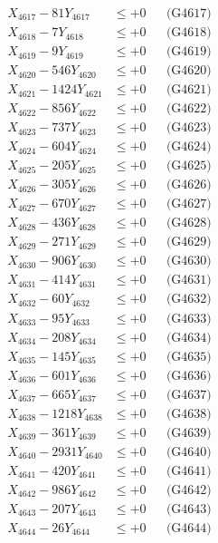 \documentclass[a4paper,10pt]{article}
\begin{document}
{\begin{align}
X_{4617} - 81Y_{4617} &\leq +0 && \text{(G4617)} \\
X_{4618} - 7Y_{4618} &\leq +0 && \text{(G4618)} \\
X_{4619} - 9Y_{4619} &\leq +0 && \text{(G4619)} \\
X_{4620} - 546Y_{4620} &\leq +0 && \text{(G4620)} \\
\allowbreak
X_{4621} - 1424Y_{4621} &\leq +0 && \text{(G4621)} \\
X_{4622} - 856Y_{4622} &\leq +0 && \text{(G4622)} \\
X_{4623} - 737Y_{4623} &\leq +0 && \text{(G4623)} \\
X_{4624} - 604Y_{4624} &\leq +0 && \text{(G4624)} \\
X_{4625} - 205Y_{4625} &\leq +0 && \text{(G4625)} \\
X_{4626} - 305Y_{4626} &\leq +0 && \text{(G4626)} \\
X_{4627} - 670Y_{4627} &\leq +0 && \text{(G4627)} \\
X_{4628} - 436Y_{4628} &\leq +0 && \text{(G4628)} \\
X_{4629} - 271Y_{4629} &\leq +0 && \text{(G4629)} \\
X_{4630} - 906Y_{4630} &\leq +0 && \text{(G4630)} \\
\allowbreak
X_{4631} - 414Y_{4631} &\leq +0 && \text{(G4631)} \\
X_{4632} - 60Y_{4632} &\leq +0 && \text{(G4632)} \\
X_{4633} - 95Y_{4633} &\leq +0 && \text{(G4633)} \\
X_{4634} - 208Y_{4634} &\leq +0 && \text{(G4634)} \\
X_{4635} - 145Y_{4635} &\leq +0 && \text{(G4635)} \\
X_{4636} - 601Y_{4636} &\leq +0 && \text{(G4636)} \\
X_{4637} - 665Y_{4637} &\leq +0 && \text{(G4637)} \\
X_{4638} - 1218Y_{4638} &\leq +0 && \text{(G4638)} \\
X_{4639} - 361Y_{4639} &\leq +0 && \text{(G4639)} \\
X_{4640} - 2931Y_{4640} &\leq +0 && \text{(G4640)} \\
\allowbreak
X_{4641} - 420Y_{4641} &\leq +0 && \text{(G4641)} \\
X_{4642} - 986Y_{4642} &\leq +0 && \text{(G4642)} \\
X_{4643} - 207Y_{4643} &\leq +0 && \text{(G4643)} \\
X_{4644} - 26Y_{4644} &\leq +0 && \text{(G4644)} \\

\end{align}}
\end{document}
